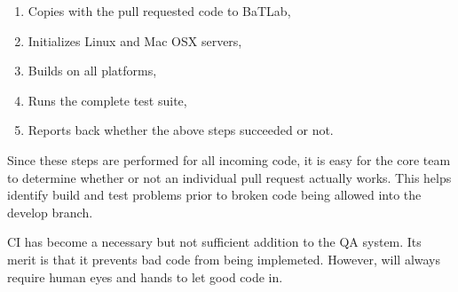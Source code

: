 \begin{enumerate}
    \item Copies \Cyclus with the pull requested code to BaTLab,
    \item Initializes Linux and Mac OSX servers,
    \item Builds \Cyclus on all platforms,
    \item Runs the complete \Cyclus test suite, 
    \item Reports back whether the above steps succeeded or not.
\end{enumerate}

Since these steps are performed for all incoming code, it is easy for the 
\Cyclus core team to determine whether or not an individual pull request 
actually works. This helps identify build and test problems prior to 
broken code being allowed into the develop branch.

\gls{CI} has become a necessary but not sufficient addition to the \Cyclus \gls{QA}
system. Its merit is that it prevents bad code from being implemeted. However, \Cyclus will always
require human eyes and hands to let good code in.


